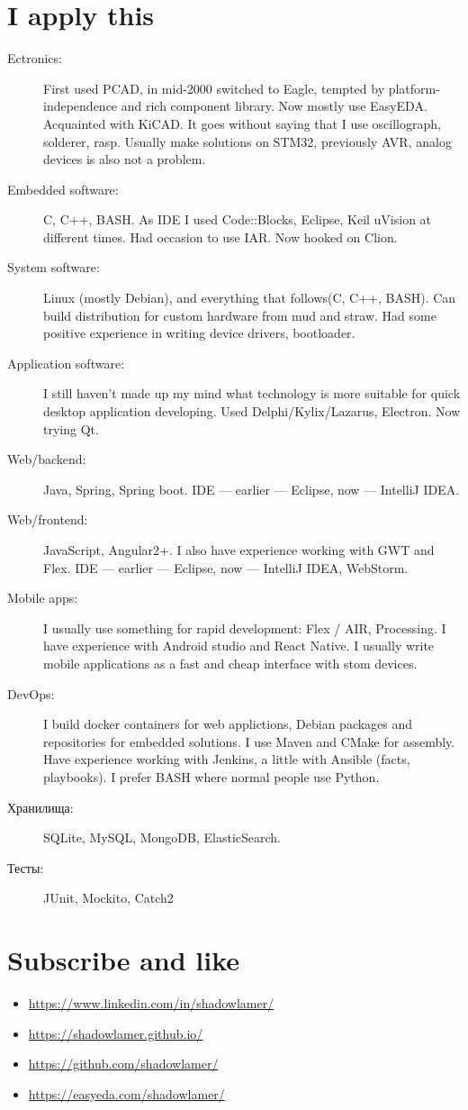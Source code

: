 \documentclass [a4paper,10pt]{article}
\begin{document}
\section*{I apply this}
\begin{description}
\item[Ectronics:]
    First used PCAD, in mid-2000 switched to Eagle, tempted by platform-independence and rich component library. Now mostly use EasyEDA. Acquainted with KiCAD. It goes without saying that I use oscillograph, solderer, rasp. Usually make solutions on STM32, previously AVR, analog devices is also not a problem.

\item[Embedded software:]
	C, C++, BASH. As IDE I used Code::Blocks, Eclipse, Keil uVision at different times. Had occasion to use IAR. Now hooked on Clion.

\item[System software:]
	Linux (mostly Debian), and everything that follows(C, C++, BASH). Can build distribution for custom hardware from mud and straw. Had some positive experience in writing device drivers, bootloader.

\item[Application software:]
	I still haven’t made up my mind what technology is more suitable for quick desktop application developing. Used Delphi/Kylix/Lazarus, Electron. Now trying Qt.

\item[Web/backend:]
	Java, Spring, Spring boot. IDE --- earlier --- Eclipse, now --- IntelliJ IDEA.

\item[Web/frontend:]
	JavaScript, Angular2+. I also have experience working with GWT and Flex. IDE --- earlier --- Eclipse, now --- IntelliJ IDEA, WebStorm.

\item[Mobile apps:]
    I usually use something for rapid development: Flex / AIR, Processing. I have experience with Android studio and React Native.
    I usually write mobile applications as a fast and cheap interface with stom devices.

\item[DevOps:]
    I build docker containers for web applictions, Debian packages and repositories for embedded solutions. I use Maven and CMake for assembly. Have experience working with Jenkins, a little with Ansible (facts, playbooks). I prefer BASH where normal people use Python.
	
\item[{Хранилища}:]
	SQLite, MySQL, MongoDB, ElasticSearch.

\item[Тесты:]
	JUnit, Mockito, Catch2
\end{description}

\section*{Subscribe and like}
\begin{itemize}
\item\url{https://www.linkedin.com/in/shadowlamer/}
\item\url{https://shadowlamer.github.io/}
\item\url{https://github.com/shadowlamer/}
\item\url{https://easyeda.com/shadowlamer/}
\end{itemize}
	
\end{document}

